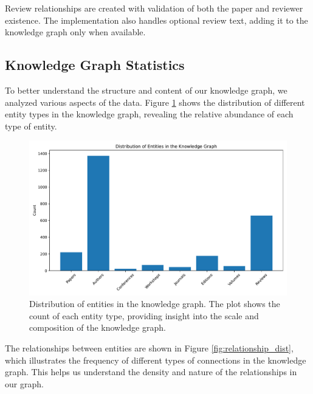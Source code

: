 \documentclass[10pt,a4paper]{article}
\begin{document}
Review relationships are created with validation of both the paper and reviewer existence. The implementation also handles optional review text, adding it to the knowledge graph only when available.

\subsection{Knowledge Graph Statistics}

To better understand the structure and content of our knowledge graph, we analyzed various aspects of the data. Figure \ref{fig:entity_dist} shows the distribution of different entity types in the knowledge graph, revealing the relative abundance of each type of entity.

\begin{figure}[H]
    \centering
    \includegraphics[width=\textwidth]{img/entity_distribution.pdf}
    \caption{Distribution of entities in the knowledge graph. The plot shows the count of each entity type, providing insight into the scale and composition of the knowledge graph.}
    \label{fig:entity_dist}
\end{figure}

The relationships between entities are shown in Figure \ref{fig:relationship_dist}, which illustrates the frequency of different types of connections in the knowledge graph. This helps us understand the density and nature of the relationships in our graph.
\end{document}
